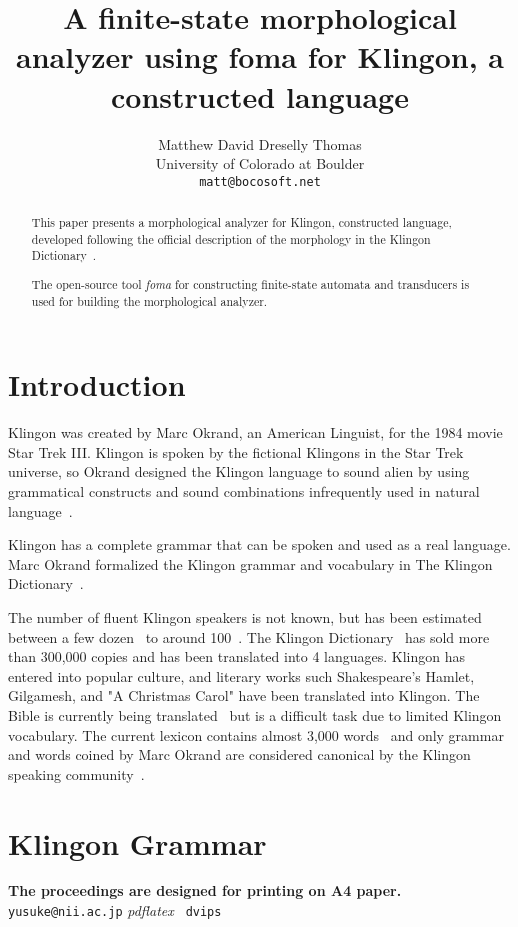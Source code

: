 \documentclass[11pt]{article}
\title{A finite-state morphological analyzer using foma for Klingon, a constructed language}
\author{Matthew David Dreselly Thomas \\
  University of Colorado at Boulder \\
  {\tt matt@bocosoft.net} \\}
\date{}
\begin{document}
\maketitle
\begin{abstract}
This paper presents a morphological analyzer for Klingon, constructed language, developed following the official description of the morphology in the Klingon Dictionary~\cite{Okrand:92}.

The open-source tool \textit{foma} for constructing finite-state automata and transducers is used for building the morphological analyzer.

\end{abstract}

\section{Introduction}

Klingon was created by Marc Okrand, an American Linguist, for the 1984 movie Star Trek III. Klingon is spoken by the fictional Klingons in the Star Trek universe, so Okrand designed the Klingon language to sound alien by using grammatical constructs and sound combinations infrequently used in natural language~\cite{KLI:Development,KLI:Sounds}.

Klingon has a complete grammar that can be spoken and used as a real language. Marc Okrand formalized the Klingon grammar and vocabulary in The Klingon Dictionary~\cite{Okrand:92}.

The number of fluent Klingon speakers is not known, but has been estimated between a few dozen~\cite{Okrent:09} to around 100~\cite{Kelly:13}. The Klingon Dictionary~\cite{Okrand:92} has sold more than 300,000 copies and has been translated into 4 languages. Klingon has entered into popular culture, and literary works such Shakespeare's Hamlet, Gilgamesh, and "A Christmas Carol" have been translated into Klingon. The Bible is currently being translated~\cite{KLI:Bible} but is a difficult task due to limited Klingon vocabulary. The current lexicon contains almost 3,000 words~\cite{Zrajm:12} and only grammar and words coined by Marc Okrand are considered canonical by the Klingon speaking community~\cite{KLI:Canonical}.

\section{Klingon Grammar}

\textbf{The proceedings are designed for printing on A4
  paper.}
\texttt{yusuke@nii.ac.jp}
\textit{pdflatex}
\texttt{ dvips}
\end{document}
